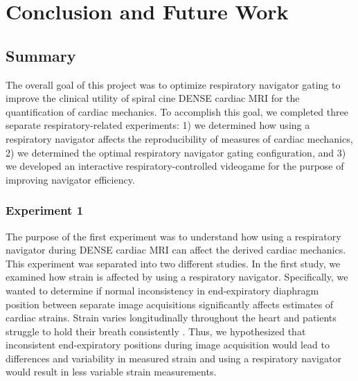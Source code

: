 \chapter{Conclusion and Future Work}

\section{Summary}
	The overall goal of this project was to optimize respiratory navigator gating to improve the clinical utility of spiral cine DENSE cardiac MRI for the quantification of cardiac mechanics. To accomplish this goal, we completed three separate respiratory-related experiments: 1) we determined how using a respiratory navigator affects the reproducibility of measures of cardiac mechanics, 2) we determined the optimal respiratory navigator gating configuration, and 3) we developed an interactive respiratory-controlled videogame for the purpose of improving navigator efficiency.
	
\subsection{Experiment 1}
	
	The purpose of the first experiment was to understand how using a respiratory navigator during DENSE cardiac MRI can affect the derived cardiac mechanics. This experiment was separated into two different studies. In the first study, we examined how strain is affected by using a respiratory navigator. Specifically, we wanted to determine if normal inconsistency in end-expiratory diaphragm position between separate image acquisitions significantly affects estimates of cardiac strains. Strain varies longitudinally throughout the heart \cite{Kuijer2002,Moore2000,Young1994a,Feng2009,NasiraeiMoghaddam2010,Donekal2013a,Suever2017} and patients struggle to hold their breath consistently \cite{Liu1993,Wang1995a,Taylor1997a,Holland1998c,Fischer2006a}. Thus, we hypothesized that inconsistent end-expiratory positions during image acquisition would lead to differences and variability in measured strain and using a respiratory navigator would result in less variable strain measurements.
	
